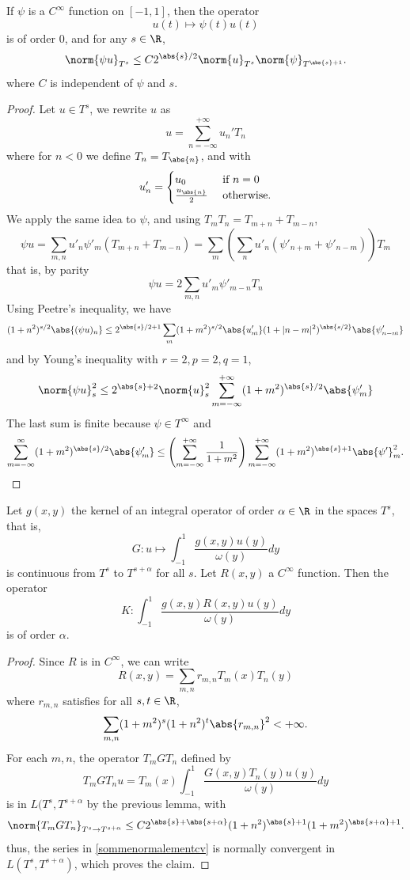 \documentclass[a4paper]{article}
\begin{document}
	\begin{Prop}
		If $\psi$ is a $C^{\infty}$ function on $[-1,1]$, then the operator
		\[ u(t) \mapsto \psi(t) u(t)\]
		is of order $0$, and for any $s \in \R$, 
		\[ \norm{\psi u}_{T^s} \leq C2^{\abs{s}/2}\norm{u}_{T^s} \norm{\psi}_{T^{\abs{s}+1}}.\]
		where $C$ is independent of $\psi$ and $s$. 
		\begin{proof}
			Let $u \in T^s$, we rewrite $u$ as 
			\[ u = \sum_{n = -\infty}^{+ \infty}u_n'T_n\]
			where for $n< 0$ we define $T_{n} = T_{\abs{n}}$, and with 
			\[u_n' = \begin{cases}
			u_0 & \text{ if } n = 0\\
			\frac{u_{\abs{n}}}{2} & \text{ otherwise.}
			\end{cases}\]
			We apply the same idea to $\psi$, and using $T_m T_n = T_{m+n} + T_{m-n}$, 
			\[\psi u = \sum_{m,n} u'_n \psi'_m (T_{m+n} + T_{m-n}) = \sum_{m} \left(\sum_{n}u'_n(\psi'_{n + m} + \psi'_{n - m})\right) T_m\]
			that is, by parity
			\[\psi u = 2\sum_{m,n} u'_m \psi'_{m-n} T_{n}\]
			Using Peetre's inequality, we have 
			\[(1 + n^2)^{s/2}\abs{(\psi u)_n} \leq 2^{\abs{s}/2+1}\sum_{m}(1 + m^2)^{s/2} \abs{u'_m}  (1 + |n-m|^2)^{\abs{s/2}} \abs{\psi'_{n-m}} \]
			and by Young's inequality with $r = 2, p = 2, q = 1$, 
			\[\norm{\psi u}_s^2 \leq 2^{\abs{s}+2}\norm{u}_s^2 \sum_{m=-\infty}^{+\infty} (1 + m^2)^{\abs{s}/2}\abs{\psi'_m} \]		
			The last sum is finite because $\psi \in T^{\infty}$ and
			\[\sum_{m=-\infty}^{\infty}(1 + m^2)^{\abs{s}/2} \abs{\psi'_m} \leq \left(\sum_{m = -\infty}^{+ \infty} \frac{1}{1 + m^2} \right)\sum_{m=-\infty}^{+\infty} (1 + m^2)^{\abs{s}+1}\abs{\psi'}_m^2.\]
		\end{proof}
		\begin{Lem}
			Let $g(x,y)$ the kernel of an integral operator of order $\alpha \in \R$ in the spaces $T^s$, that is,
			\[G : u \mapsto \int_{-1}^{1} \frac{g(x,y) u(y)}{\omega(y)}dy\]
			is continuous from $T^s$ to $T^{s + \alpha}$ for all $s$. Let $R(x,y)$ a $C^{\infty}$ function. Then the operator 
			\[K : \int_{-1}^{1} \frac{g(x,y) R(x,y) u(y)}{\omega(y)}dy\]
			is of order $\alpha$. 
		\end{Lem}
		\begin{proof}
			Since $R$ is in $C^{\infty}$, we can write 
			\begin{equation}
			R(x,y) = \sum_{m,n} r_{m,n} T_m(x) T_n(y)
			\label{sommenormalementcv}
			\end{equation}
			where $r_{m,n}$ satisfies for all $s,t \in \R$, 
			\[\sum_{m,n} (1 + m^2)^s (1 + n^2)^t\abs{r_{m,n}}^2 < +\infty.\] 
			For each $m,n$, the operator $T_m G T_n$ defined by 
			\[ T_m G T_n u = T_m(x) \int_{-1}^{1} \dfrac{G(x,y) T_n(y)u(y)}{\omega(y)}dy\]
			is in $L(T^s,T^{s+\alpha}$ by the previous lemma, with 	\[\norm{T_m G T_n}_{T^s \to T^{s+\alpha}} \leq C 2^{\abs{s} + \abs{s + \alpha}}(1 + n^2)^{\abs{s}+1}(1 + m^2)^{\abs{s+ \alpha} + 1}.\]
			thus, the series in \eqref{sommenormalementcv} is normally convergent in $L(T^s, T^{s + \alpha})$, which proves the claim. 
		\end{proof}
	\end{Prop}
\end{document}
